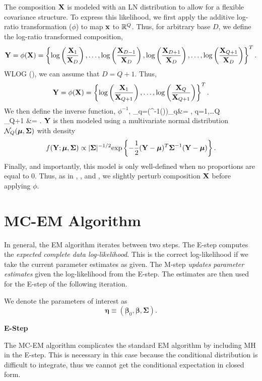 \documentclass{template}
\begin{document}
The composition $\mathbf{X}$ is modeled with an LN distribution to allow for a flexible covariance structure. To express this likelihood, we first apply the additive log-ratio transformation ($\phi$) to map $\mathbf{x}$ to $\mathbb{R}^{Q}$. Thus, for arbitrary base $D$, we define the log-ratio transformed composition,
$$\mathbf{Y}=\phi(\mathbf{X})=\left\{\log\left(\dfrac{\mathbf{X}_1}{\mathbf{X}_D}\right),\ldots,\log\left(\dfrac{\mathbf{X}_{D-1}}{\mathbf{X}_D}\right),\log\left(\dfrac{\mathbf{X}_{D+1}}{\mathbf{X}_D}\right),\ldots,\log\left(\dfrac{\mathbf{X}_{Q+1}}{\mathbf{X}_D}\right)\right\}^T.$$
WLOG (\cite{aitchison1986statistical}), we can assume that $D=Q+1$. Thus,
$$\mathbf{Y}=\phi(\mathbf{X})=\left\{\log\left(\dfrac{\mathbf{X}_1}{\mathbf{X}_{Q+1}}\right),\ldots,\log\left(\dfrac{\mathbf{X}_{Q}}{\mathbf{X}_{Q+1}}\right)\right\}^T.$$
We then define the inverse function, $\phi^{-1}$,
\bal 
{}_q=(\phi^{-1}())_q&= , \quad q=1,\ldots Q\\
_{Q+1} &= .
\eal 
$\mathbf{Y}$ is then modeled using a multivariate normal distribution $\mathcal{N}_{Q}(\boldsymbol{\mu},\boldsymbol{\Sigma})$ with density
$$f(\mathbf{Y}; \boldsymbol{\mu},\boldsymbol{\Sigma}) \propto |\boldsymbol{\Sigma}|^{-1/2} \text{exp}\left\{-\dfrac{1}{2}(\mathbf{Y}-\boldsymbol{\mu})^T\boldsymbol{\Sigma}^{-1}(\mathbf{Y}-\boldsymbol{\mu})\right\}. $$
Finally, and importantly, this model is only well-defined when no proportions are equal to $0$. Thus, as in \cite{aitchison1986statistical}, \cite{billheimer2001statistical}, and \cite{xia2013logistic}, we slightly perturb composition $\mathbf{X}$ before applying $\phi$.


\section{MC-EM Algorithm}



In general, the EM algorithm iterates between two steps. The E-step computes the \textit{expected complete data log-likelihood}. This is the correct log-likelihood if we take the current parameter estimates as given. The M-step \textit{updates parameter estimates} given the log-likelihood from the E-step. The estimates are then used for the E-step of the following iteration.

We denote the parameters of interest as $$\boldsymbol{\eta}\equiv (\boldsymbol{\beta}_0,\boldsymbol{\beta},\boldsymbol{\Sigma}).$$

\noindent\textbf{E-Step}

The MC-EM algorithm complicates the standard EM algorithm by including MH in the E-step. This is necessary in this case because the conditional distribution is difficult to integrate, thus we cannot get the conditional expectation in closed form.
\end{document}
